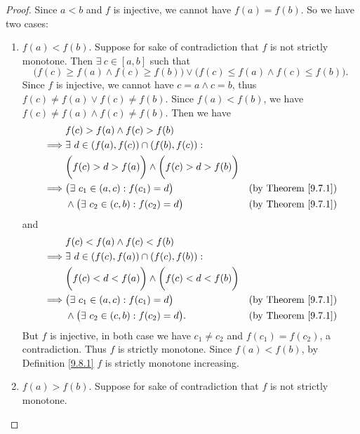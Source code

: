 \begin{proof}
    Since \(a < b\) and \(f\) is injective, we cannot have \(f(a) = f(b)\).
    So we have two cases:
    \begin{enumerate}
        \item \(f(a) < f(b)\).
        Suppose for sake of contradiction that \(f\) is not strictly monotone.
        Then \(\exists\ c \in [a, b]\) such that
        \[
            \bigg(f(c) \geq f(a) \land f(c) \geq f(b)\bigg) \lor \bigg(f(c) \leq f(a) \land f(c) \leq f(b)\bigg).
        \]
        Since \(f\) is injective, we cannot have \(c = a \land c = b\), thus \(f(c) \neq f(a) \lor f(c) \neq f(b)\).
        Since \(f(a) < f(b)\), we have \(f(c) \neq f(a) \land f(c) \neq f(b)\).
        Then we have
        \begin{align*}
            & f(c) > f(a) \land f(c) > f(b) \\
            \implies & \exists\ d \in (f(a), f(c)) \cap (f(b), f(c)) : \\
            & \bigg(f(c) > d > f(a)\bigg) \land \bigg(f(c) > d > f(b)\bigg) \\
            \implies & \big(\exists\ c_1 \in (a, c) : f(c_1) = d\big) & \text{(by Theorem \ref{9.7.1})} \\
            & \land \big(\exists\ c_2 \in (c, b) : f(c_2) = d\big) & \text{(by Theorem \ref{9.7.1})} \\
        \end{align*}
        and
        \begin{align*}
            & f(c) < f(a) \land f(c) < f(b) \\
            \implies & \exists\ d \in (f(c), f(a)) \cap (f(c), f(b)) : \\
            & \bigg(f(c) < d < f(a)\bigg) \land \bigg(f(c) < d < f(b)\bigg) \\
            \implies & \big(\exists\ c_1 \in (a, c) : f(c_1) = d\big) & \text{(by Theorem \ref{9.7.1})} \\
            & \land \big(\exists\ c_2 \in (c, b) : f(c_2) = d\big). & \text{(by Theorem \ref{9.7.1})} \\
        \end{align*}
        But \(f\) is injective, in both case we have \(c_1 \neq c_2\) and \(f(c_1) = f(c_2)\), a contradiction.
        Thus \(f\) is strictly monotone.
        Since \(f(a) < f(b)\), by Definition \ref{9.8.1} \(f\) is strictly monotone increasing.
        \item \(f(a) > f(b)\).
        Suppose for sake of contradiction that \(f\) is not strictly monotone.

\end{enumerate}
\end{proof}

